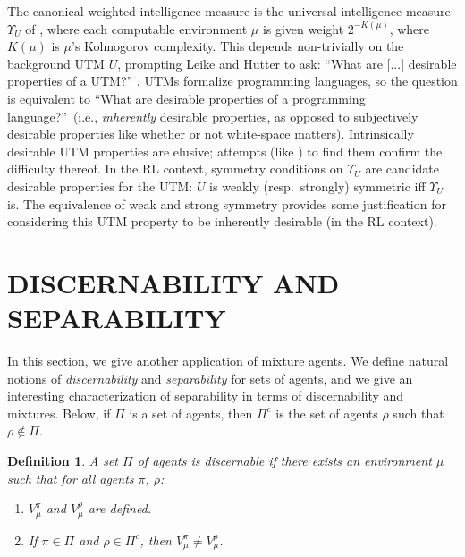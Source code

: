 \documentclass[twoside]{article}
\newtheorem{definition}[theorem]{Definition}
\begin{document}
The canonical weighted intelligence measure is the universal
intelligence measure $\Upsilon_U$ of \cite{legg2007universal},
where each computable environment
$\mu$ is given weight $2^{-K(\mu)}$, where $K(\mu)$ is $\mu$'s Kolmogorov complexity.
This depends non-trivially on the background UTM $U$,
prompting Leike and Hutter to ask: ``What are [...] desirable
properties of a UTM?'' \cite{leike2015bad}.
UTMs formalize programming languages, so the question is equivalent
to ``What are desirable properties of a programming language?''\ (i.e., \emph{inherently}
desirable properties, as opposed to subjectively desirable properties like whether or
not white-space matters).
Intrinsically desirable UTM properties are elusive; attempts
(like \cite{muller2010stationary}) to find them confirm the difficulty thereof.
In the RL context, symmetry conditions on $\Upsilon_U$ are candidate desirable properties
for the UTM: $U$ is weakly (resp.\ strongly) symmetric iff $\Upsilon_U$ is.
The equivalence of weak and strong symmetry provides some justification for
considering this UTM property to be inherently desirable (in the RL context).


\section{DISCERNABILITY AND SEPARABILITY}

In this section, we give another application of mixture agents.
We define natural notions of \emph{discernability} and \emph{separability}
for sets of agents,
and we give an interesting characterization of separability
in terms of discernability and mixtures.
Below, if $\Pi$ is a set of agents, then
$\Pi^c$ is the set of agents $\rho$ such that $\rho\not\in\Pi$.

\begin{definition}
\label{discernabilitydefn}
    A set $\Pi$ of agents is \emph{discernable} if there exists
    an environment $\mu$ such that for all agents $\pi$, $\rho$:
    \begin{enumerate}
        \item $V^\pi_\mu$ and $V^\rho_\mu$ are defined.
        \item If $\pi\in\Pi$ and $\rho\in\Pi^c$, then $V^\pi_\mu\not=V^\rho_\mu$.
    \end{enumerate}
\end{definition}
\end{document}
